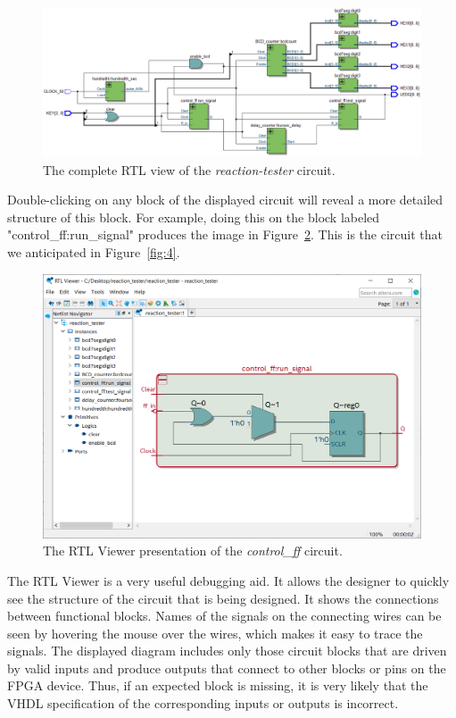 \documentclass[11pt, twoside, pdftex]{article}
\begin{document}
\begin{figure}[H]
   \begin{center}
      \includegraphics[scale=0.45]{figures/figure15.png}
   \caption{The complete RTL view of the {\it reaction-tester} circuit.} 
	 \label{fig:15}
	 \end{center}
\end{figure}

Double-clicking on any block of the displayed circuit will reveal a more detailed
structure of this block. For example, doing this on the block labeled
"control\_ff:run\_signal" produces the image in Figure~\ref{fig:16}. This is the circuit that
we anticipated in Figure~\ref{fig:4}.

\begin{figure}[H]
   \begin{center}
      \includegraphics[scale=0.55]{figures/figure16.png}
   \caption{The RTL Viewer presentation of the {\it control\_ff} circuit.} 
	 \label{fig:16}
	 \end{center}
\end{figure}

The RTL Viewer is a very useful debugging aid. It allows the designer to quickly see
the structure of the circuit that is being designed. It shows the connections between
functional blocks. Names of the signals on the connecting wires can be seen by
hovering the mouse over the wires, which makes it easy to trace the signals. 
The displayed diagram includes only those circuit
blocks that are driven by valid inputs and produce outputs that connect to other
blocks or pins on the FPGA device. Thus, if an expected block is missing, it is 
very likely that the VHDL specification of the corresponding inputs or outputs
is incorrect.
\end{document}
